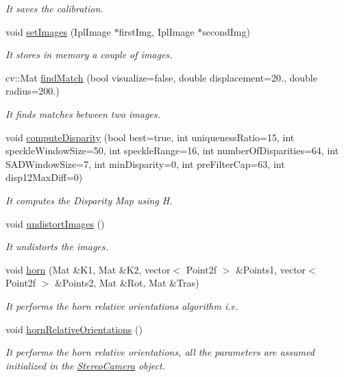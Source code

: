 \begin{DoxyCompactItemize}
\begin{DoxyCompactList}\small\item\em It saves the calibration. \end{DoxyCompactList}\item 
void \hyperlink{classStereoCamera_a5e24f7d17a11adb4a6310df7f7e2de5b}{set\+Images} (Ipl\+Image $\ast$first\+Img, Ipl\+Image $\ast$second\+Img)
\begin{DoxyCompactList}\small\item\em It stores in memory a couple of images. \end{DoxyCompactList}\item 
cv\+::\+Mat \hyperlink{classStereoCamera_aeb1cf4e41058cd70c7df6b8c2511548d}{find\+Match} (bool visualize=false, double displacement=20., double radius=200.)
\begin{DoxyCompactList}\small\item\em It finds matches between two images. \end{DoxyCompactList}\item 
void \hyperlink{classStereoCamera_a79e986f2970bb2c5b5acd1ede65984aa}{compute\+Disparity} (bool best=true, int uniqueness\+Ratio=15, int speckle\+Window\+Size=50, int speckle\+Range=16, int number\+Of\+Disparities=64, int S\+A\+D\+Window\+Size=7, int min\+Disparity=0, int pre\+Filter\+Cap=63, int disp12\+Max\+Diff=0)
\begin{DoxyCompactList}\small\item\em It computes the Disparity Map using H. \end{DoxyCompactList}\item 
void \hyperlink{classStereoCamera_a2751f357e5fabc7099303d45425208d7}{undistort\+Images} ()
\begin{DoxyCompactList}\small\item\em It undistorts the images. \end{DoxyCompactList}\item 
void \hyperlink{classStereoCamera_adf155975709fdbf09d3133899d074a02}{horn} (Mat \&K1, Mat \&K2, vector$<$ Point2f $>$ \&Points1, vector$<$ Point2f $>$ \&Points2, Mat \&Rot, Mat \&Tras)
\begin{DoxyCompactList}\small\item\em It performs the horn relative orientations algorithm i.\+e. \end{DoxyCompactList}\item 
void \hyperlink{classStereoCamera_a36dae897d07544e8faca8c90216173a6}{horn\+Relative\+Orientations} ()
\begin{DoxyCompactList}\small\item\em It performs the horn relative orientations, all the parameters are assumed initialized in the \hyperlink{classStereoCamera}{Stereo\+Camera} object. \end{DoxyCompactList}\item 

\end{DoxyCompactItemize}
